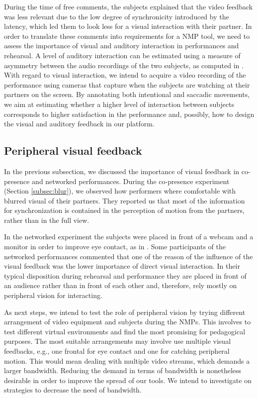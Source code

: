 During the time of free comments, the subjects explained that the video feedback was less relevant due to the low degree of synchronicity introduced by the latency, which led them to look less for a visual interaction with their partner. In order to translate these comments into requirements for a NMP tool, we need to assess the importance of visual and auditory interaction in performances and rehearsal. A level of auditory interaction can be estimated using a measure of asymmetry between the audio recordings of the two subjects, as computed in \cite{Chafe3}. With regard to visual interaction, we intend to acquire a video recording of the performance using cameras that capture when the subjects are watching at their partners on the screen. By annotating both intentional and saccadic movements, we aim at estimating whether a higher level of interaction between subjects corresponds to higher satisfaction in the performance and, possibly, how to design the visual and auditory feedback in our platform.
 
\subsection{Peripheral visual feedback}
In the previous subsection, we discussed the importance of visual feedback in co-presence and networked performances. During the co-presence experiment (Section \ref{subsec:blur}), we observed how performers where comfortable with blurred visual of their partners. They reported us that most of the information for synchronization is contained in the perception of motion from the partners, rather than in the full view.

In the networked experiment the subjects were placed in front of a webcam and a monitor in order to improve eye contact, as in \cite{duffy2017new}. Some participants of the networked performances commented that one of the reason of the influence of the visual feedback was the lower importance of direct visual interaction. In their typical disposition during rehearsal and performance they are placed in front of an audience rather than in front of each other and, therefore, rely mostly on peripheral vision for interacting.

As next steps, we intend to test the role of peripheral vision by trying different arrangement of video equipment and subjects during the NMPs. This involves to test different virtual environments and find the most promising for pedagogical purposes.  The most suitable arrangements may involve use multiple visual feedbacks, e.g., one frontal for eye contact and one for catching peripheral motion. This would mean dealing with multiple video streams, which demands a larger bandwidth. Reducing the demand in terms of bandwidth is nonetheless desirable in order to improve the spread of our tools. We intend to investigate on strategies to decrease the need of bandwidth.


